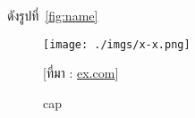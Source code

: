 ดังรูปที่~\ref{fig:name}


\begin{figure}[!h]\centering
    \texttt{[image: ./imgs/x-x.png]}
    \caption{cap}\label{fig:x-x}
    \small [ที่มา : \url{ex.com}]
\end{figure}

\chapter{}

\section{}

\subsection{}

\subsubsection{}
